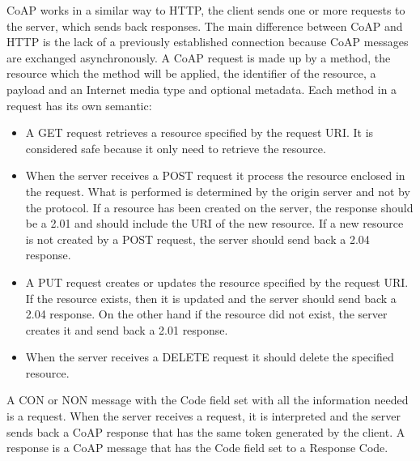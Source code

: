 	CoAP works in a similar way to HTTP, the client sends one or more requests to the server, which sends back responses.\newline
	The main difference between CoAP and HTTP is the lack of a previously established connection because CoAP messages are exchanged asynchronously.\newline
	A CoAP request is made up by a method, the resource which the method will be applied, the identifier of the resource,
	a payload and an Internet media type and optional metadata.\newline
	Each method in a request has its own semantic:
	\begin{itemize}
		\item A GET request retrieves a resource specified by the request URI.
		It is considered safe because it only need to retrieve the resource.
		
		\item When the server receives a POST request it process the resource enclosed in the request.
		What is performed is determined by the origin server and not by the protocol.
		If a resource has been created on the server, the response should be a 2.01 and should include the URI of the new resource.
		If a new resource is not created by a POST request, the server should send back a 2.04 response.
		
		\item A PUT request creates or updates the resource specified by the request URI.
		If the resource exists, then it is updated and the server should send back a 2.04 response.
		On the other hand if the resource did not exist, the server creates it and send back a 2.01 response.
		
		\item When the server receives a DELETE request it should delete the specified resource.
		
	\end{itemize}
	
	A CON or NON message with the Code field set with all the information needed is a request.\newline
	When the server receives a request, it is interpreted and the server sends back a CoAP response that has the same token generated by the client.\newline
	A response is a CoAP message that has the Code field set to a Response Code.\newline

